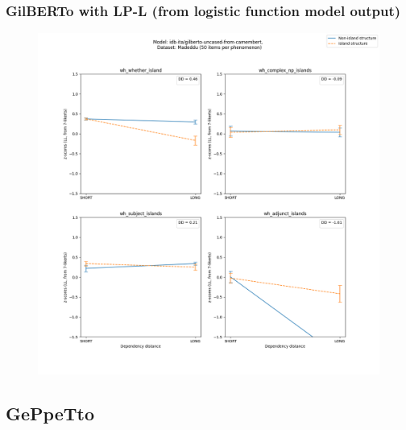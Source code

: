 \subsubsection{GilBERTo with LP-L (from logistic function model output)}
\begin{figure}[h]
	\centering
	\includegraphics[width=1\textwidth]{images/Chapter1/Madeddu_wh_idb-ita_gilberto-uncased-from-camembert_LL-zscores-likert-2022-07-11.png} 
\end{figure}

\clearpage
\subsection{GePpeTto}

